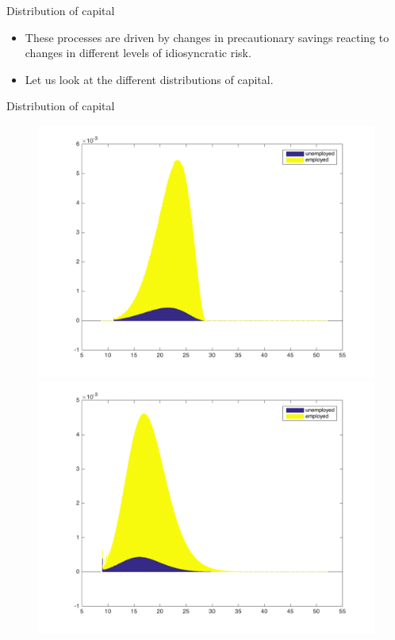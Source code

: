 \documentclass{beamer}
\begin{document}
	
\begin{frame}{Distribution of capital}
	\begin{itemize}
	
	\item {
These processes are driven by changes in precautionary savings reacting to changes in different levels of idiosyncratic risk. 
	}
	\item {
Let us look at the different distributions of capital. 
	}

	\end{itemize} 
\end{frame}



\begin{frame}{Distribution of capital}
 
\begin{figure}[!tbp]
  \centering
  \begin{minipage}[b]{0.32\textwidth}
    \includegraphics[width=\textwidth]{distribution1}
  \end{minipage}
  \hfill
  \begin{minipage}[b]{0.32\textwidth}
    \includegraphics[width=\textwidth]{distribution2}

\end{minipage}
\end{figure}
\end{frame}
\end{document}
